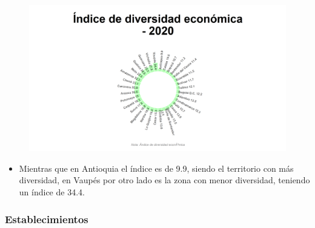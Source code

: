     \begin{figure}[H]
        \caption[Índice de diversidad económica por departamentos para 2020 ]{\label{diversidad_econ_dptos} }
        \begin{center}
        \includegraphics[width=\textwidth,keepaspectratio]{img/var_300_static.png}
        \end{center}
    \end{figure}
            \begin{itemize}
                    \item Mientras que en Antioquia el índice es de 9.9, siendo el territorio con más diversidad, en Vaupés por otro lado es la zona con menor diversidad, teniendo un índice de 34.4.
                    \end{itemize}

        \subsubsection{Establecimientos}

